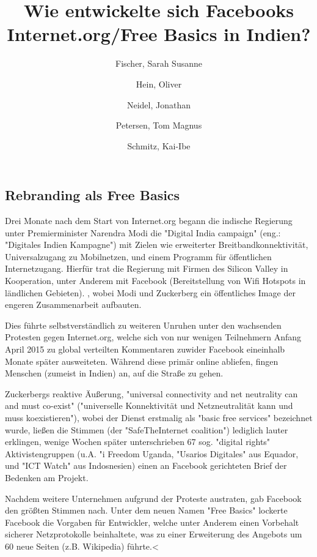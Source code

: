 \documentclass{article}
\title{Wie entwickelte sich Facebooks Internet.org/Free Basics in Indien?}
\author{
  Fischer, Sarah Susanne\\
  \and
  Hein, Oliver\\
  \and
  Neidel, Jonathan\\
  \and
  Petersen, Tom Magnus\\
  \and
  Schmitz, Kai-Ibe\\
}
\begin{document}
\maketitle
\subsection{Rebranding als Free Basics}

Drei Monate nach dem Start von Internet.org begann die indische Regierung unter Premierminister Narendra Modi die "Digital India campaign" (eng.: "Digitales Indien Kampagne") mit Zielen wie erweiterter Breitbandkonnektivität, Universalzugang zu Mobilnetzen, und einem Programm für öffentlichen Internetzugang. %
Hierfür trat die Regierung mit Firmen des Silicon Valley in Kooperation, unter Anderem mit Facebook (Bereitstellung von Wifi Hotspots in ländlichen Gebieten).%
, wobei Modi und Zuckerberg ein öffentliches Image der engeren Zusammenarbeit aufbauten.

\medskip

Dies führte selbstverständlich zu weiteren Unruhen unter den wachsenden Protesten gegen Internet.org, welche sich von nur wenigen Teilnehmern Anfang April 2015 zu global verteilten Kommentaren zuwider Facebook eineinhalb Monate später ausweiteten. %
Während diese primär online abliefen, fingen Menschen (zumeist in Indien) an, auf die Straße zu gehen.

\medskip

Zuckerbergs reaktive Äußerung, "universal connectivity and net neutrality can and must co-exist" ("universelle Konnektivität und Netzneutralität kann und muss koexistieren"), wobei der Dienst erstmalig als "basic free services" bezeichnet wurde, ließen die Stimmen (der "SafeTheInternet coalition") lediglich lauter erklingen, wenige Wochen später unterschrieben 67 sog. "digital rights" Aktivistengruppen (u.A. "i Freedom Uganda, "Usarios Digitales" aus Equador, und "ICT Watch" aus Indosnesien) einen an Facebook gerichteten Brief der Bedenken am Projekt.

\medskip
\medskip

Nachdem weitere Unternehmen aufgrund der Proteste austraten, gab Facebook den größten Stimmen nach. Unter dem neuen Namen "Free Basics" lockerte Facebook die Vorgaben für Entwickler, welche unter Anderem einen Vorbehalt sicherer Netzprotokolle beinhaltete, was zu einer Erweiterung des Angebots um 60 neue Seiten (z.B. Wikipedia) führte.<

\medskip

\end{document}

